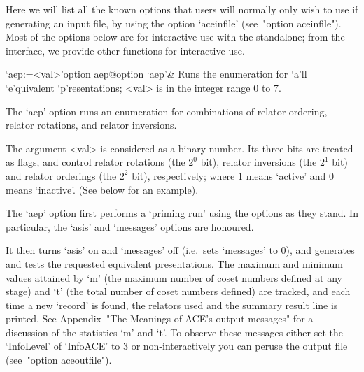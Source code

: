 

Here we will list  all  the  known  {\ACE}  options  that  users  will
normally only wish to use if generating an input file,  by  using  the
option `aceinfile' (see~"option aceinfile"). Most of the options below
are  for  interactive  use  with  the  standalone;  from  the   {\GAP}
interface, we provide other functions for interactive use.


\beginitems

\>`aep:=<val>'{option aep}@{option `aep'}&
Runs the enumeration for `a'll `e'quivalent `p'resentations;
<val> is in the integer range 0 to 7.

The `aep' option runs  an  enumeration  for  combinations  of  relator
ordering, relator rotations, and relator inversions.

The argument <val> is considered as a binary number.  Its  three  bits
are treated as flags, and control relator rotations (the  $2^0$  bit),
relator inversions (the $2^1$ bit) and relator  orderings  (the  $2^2$
bit),  respectively;  where  $1$  means  \lq{}active'  and  $0$  means
\lq{}inactive'. (See below for an example).

The `aep' option first performs a \lq{}priming run' using the  options
as they stand. In particular, the `asis' and  `messages'  options  are
honoured.

It then turns `asis' on and `messages' off  (i.e.~sets  `messages'  to
0), and generates and tests the  requested  equivalent  presentations.
The maximum and minimum values attained by `m' (the maximum number  of
coset numbers defined at any stage) and `t' (the total number of coset
numbers defined) are tracked, and each  time  a  new  \lq{}record'  is
found, the relators used and the summary result line is  printed.  See
Appendix~"The Meanings of ACE's output messages" for a  discussion  of
the statistics `m' and `t'. To observe these messages either  set  the
`InfoLevel' of `InfoACE' to 3 or non-interactively you can peruse  the
{\ACE} output file (see~"option aceoutfile").

